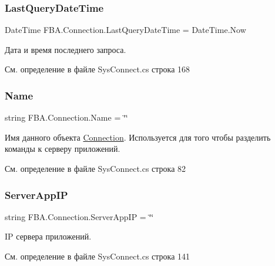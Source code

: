 \subsubsection{\texorpdfstring{Last\+Query\+Date\+Time}{LastQueryDateTime}}
{\footnotesize\ttfamily Date\+Time F\+B\+A.\+Connection.\+Last\+Query\+Date\+Time = Date\+Time.\+Now}



Дата и время последнего запроса. 



См. определение в файле Sys\+Connect.\+cs строка 168

\mbox{\label{class_f_b_a_1_1_connection_ad06450c04a115c5f49848d0bc861b63e}} 
\subsubsection{\texorpdfstring{Name}{Name}}
{\footnotesize\ttfamily string F\+B\+A.\+Connection.\+Name = \char`\"{}\char`\"{}}



Имя данного объекта \mbox{\hyperlink{class_f_b_a_1_1_connection}{Connection}}. Используется для того чтобы разделить команды к серверу приложений. 



См. определение в файле Sys\+Connect.\+cs строка 82

\mbox{\label{class_f_b_a_1_1_connection_a24c27a6a036bb03da1bbe1cdd29b1f16}} 
\subsubsection{\texorpdfstring{Server\+App\+IP}{ServerAppIP}}
{\footnotesize\ttfamily string F\+B\+A.\+Connection.\+Server\+App\+IP = \char`\"{}\char`\"{}}



IP сервера приложений. 



См. определение в файле Sys\+Connect.\+cs строка 141

\mbox{\label{class_f_b_a_1_1_connection_af8d3357489e91efcf98ebf7b56110348}} 
